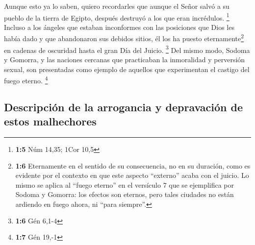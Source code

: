  Aunque esto ya lo saben, quiero recordarles que aunque el
Señor salvó a su pueblo de la tierra de Egipto, después destruyó a los
que eran incrédulos. \footnote{\textbf{1:5} Núm 14,35; 1Cor 10,5}
 Incluso a los ángeles que estaban inconformes con las
posiciones que Dios les había dado y que abandonaron sus debidos sitios,
él los ha puesto eternamente\footnote{\textbf{1:6} Eternamente en el
  sentido de su consecuencia, no en su duración, como es evidente por el
  contexto en que este aspecto ``externo'' acaba con el juicio. Lo mismo
  se aplica al ``fuego eterno'' en el versículo 7 que se ejemplifica por
  Sodoma y Gomorra: los efectos son eternos, pero tales ciudades no
  están ardiendo en fuego ahora, ni ``para siempre''.} en cadenas de
oscuridad hasta el gran Día del Juicio. \footnote{\textbf{1:6} Gén 6,1-4}
 Del mismo modo, Sodoma y Gomorra, y las naciones cercanas
que practicaban la inmoralidad y perversión sexual, son presentadas como
ejemplo de aquellos que experimentan el castigo del fuego eterno.
\footnote{\textbf{1:7} Gén 19,-1}

\hypertarget{descripciuxf3n-de-la-arrogancia-y-depravaciuxf3n-de-estos-malhechores}{%
\subsection{Descripción de la arrogancia y depravación de estos
malhechores}\label{descripciuxf3n-de-la-arrogancia-y-depravaciuxf3n-de-estos-malhechores}}

